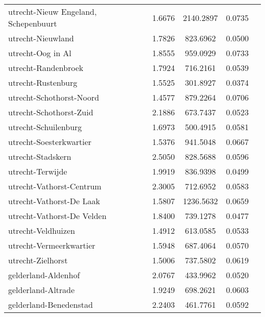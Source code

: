 \begin{longtable}{llccc}
	utrecht-Nieuw Engeland, Schepenbuurt      & 1.6676  & 2140.2897 & 0.0735                 \\
	utrecht-Nieuwland                         & 1.7826  & 823.6962  & 0.0500                 \\
	utrecht-Oog in Al                         & 1.8555  & 959.0929  & 0.0733                 \\
	utrecht-Randenbroek                       & 1.7924  & 716.2161  & 0.0539                 \\
	utrecht-Rustenburg                        & 1.5525  & 301.8927  & 0.0374                 \\
	utrecht-Schothorst-Noord                  & 1.4577  & 879.2264  & 0.0706                 \\
	utrecht-Schothorst-Zuid                   & 2.1886  & 673.7437  & 0.0523                 \\
	utrecht-Schuilenburg                      & 1.6973  & 500.4915  & 0.0581                 \\
	utrecht-Soesterkwartier                   & 1.5376  & 941.5048  & 0.0667                 \\
	utrecht-Stadskern                         & 2.5050  & 828.5688  & 0.0596                 \\
	utrecht-Terwijde                          & 1.9919  & 836.9398  & 0.0499                 \\
	utrecht-Vathorst-Centrum                  & 2.3005  & 712.6952  & 0.0583                 \\
	utrecht-Vathorst-De Laak                  & 1.5807  & 1236.5632 & 0.0659                 \\
	utrecht-Vathorst-De Velden                & 1.8400  & 739.1278  & 0.0477                 \\
	utrecht-Veldhuizen                        & 1.4912  & 613.0585  & 0.0533                 \\
	utrecht-Vermeerkwartier                   & 1.5948  & 687.4064  & 0.0570                 \\
	utrecht-Zielhorst                         & 1.5006  & 737.5802  & 0.0619                 \\
	gelderland-Aldenhof                       & 2.0767  & 433.9962  & 0.0520                 \\
	gelderland-Altrade                        & 1.9249  & 698.2621  & 0.0603                 \\
	gelderland-Benedenstad                    & 2.2403  & 461.7761  & 0.0592                 \\

\end{longtable}
